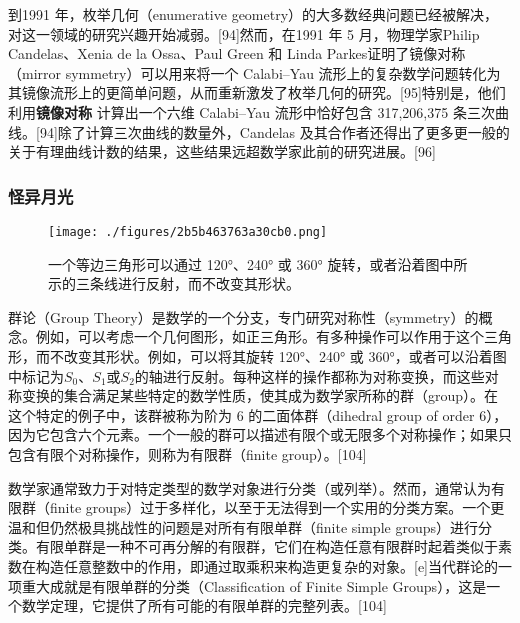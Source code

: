 到1991 年，枚举几何（enumerative geometry）的大多数经典问题已经被解决，对这一领域的研究兴趣开始减弱。[94]然而，在1991 年 5 月，物理学家Philip Candelas、Xenia de la Ossa、Paul Green 和 Linda Parkes证明了镜像对称（mirror symmetry）可以用来将一个 Calabi–Yau 流形上的复杂数学问题转化为其镜像流形上的更简单问题，从而重新激发了枚举几何的研究。[95]特别是，他们利用\textbf{镜像对称} 计算出一个六维 Calabi–Yau 流形中恰好包含 317,206,375 条三次曲线。[94]除了计算三次曲线的数量外，Candelas 及其合作者还得出了更多更一般的关于有理曲线计数的结果，这些结果远超数学家此前的研究进展。[96]
\subsubsection{怪异月光}
\begin{figure}[ht]
\centering
\texttt{[image: ./figures/2b5b463763a30cb0.png]}
\caption{一个等边三角形可以通过 120°、240° 或 360° 旋转，或者沿着图中所示的三条线进行反射，而不改变其形状。} \label{fig_String_12}
\end{figure}
群论（Group Theory）是数学的一个分支，专门研究对称性（symmetry）的概念。例如，可以考虑一个几何图形，如正三角形。有多种操作可以作用于这个三角形，而不改变其形状。例如，可以将其旋转 120°、240° 或 360°，或者可以沿着图中标记为\(S_0\)、\(S_1\)或\(S_2\)的轴进行反射。每种这样的操作都称为对称变换，而这些对称变换的集合满足某些特定的数学性质，使其成为数学家所称的群（group）。在这个特定的例子中，该群被称为阶为 6 的二面体群（dihedral group of order 6），因为它包含六个元素。一个一般的群可以描述有限个或无限多个对称操作；如果只包含有限个对称操作，则称为有限群（finite group）。[104]

数学家通常致力于对特定类型的数学对象进行分类（或列举）。然而，通常认为有限群（finite groups）过于多样化，以至于无法得到一个实用的分类方案。一个更温和但仍然极具挑战性的问题是对所有有限单群（finite simple groups）进行分类。有限单群是一种不可再分解的有限群，它们在构造任意有限群时起着类似于素数在构造任意整数中的作用，即通过取乘积来构造更复杂的对象。[e]当代群论的一项重大成就是有限单群的分类（Classification of Finite Simple Groups），这是一个数学定理，它提供了所有可能的有限单群的完整列表。[104]

